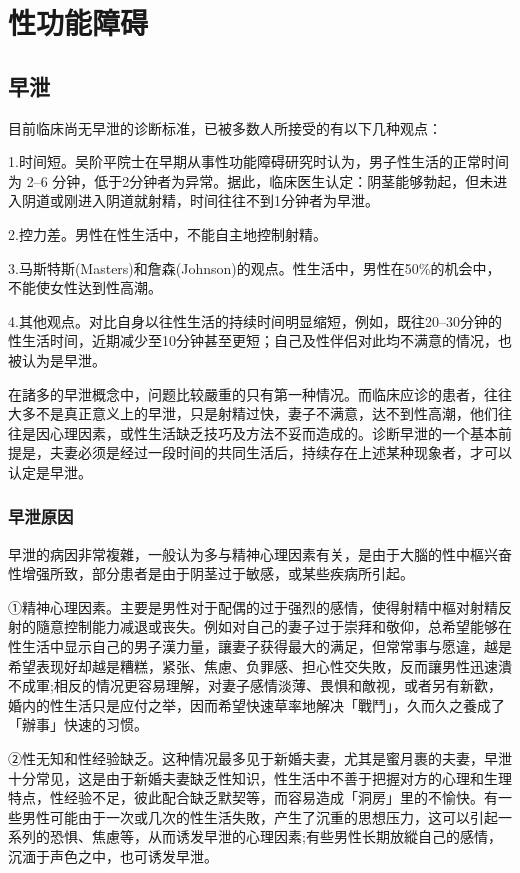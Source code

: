 \documentclass[12pt,UTF8]{ctexbook}
\begin{document}
\part{性功能障碍}

\chapter{早泄}

目前临床尚无早泄的诊断标准，已被多数人所接受的有以下几种观点：

1.时间短。吴阶平院士在早期从事性功能障碍研究时认为，男子性生活的正常时间为 2--6 分钟，低于2分钟者为异常。据此，临床医生认定：阴茎能够勃起，但未进入阴道或刚进入阴道就射精，时间往往不到1分钟者为早泄。

2.控力差。男性在性生活中，不能自主地控制射精。

3.马斯特斯(Masters)和詹森(Johnson)的观点。性生活中，男性在50\%的机会中，不能使女性达到性高潮。

4.其他观点。对比自身以往性生活的持续时间明显缩短，例如，既往20--30分钟的性生活时间，近期减少至10分钟甚至更短；自己及性伴侣对此均不满意的情况，也被认为是早泄。

在諸多的早泄概念中，问题比较嚴重的只有第一种情况。而临床应诊的患者，往往大多不是真正意义上的早泄，只是射精过快，妻子不满意，达不到性高潮，他们往往是因心理因素，或性生活缺乏技巧及方法不妥而造成的。诊断早泄的一个基本前提是，夫妻必须是经过一段时间的共同生活后，持续存在上述某种现象者，才可以认定是早泄。

\section{早泄原因}



早泄的病因非常複雜，一般认为多与精神心理因素有关，是由于大腦的性中樞兴奋性增强所致，部分患者是由于阴茎过于敏感，或某些疾病所引起。

①精神心理因素。主要是男性对于配偶的过于强烈的感情，使得射精中樞对射精反射的隨意控制能力减退或丧失。例如对自己的妻子过于崇拜和敬仰，总希望能够在性生活中显示自己的男子漢力量，讓妻子获得最大的满足，但常常事与愿違，越是希望表现好却越是糟糕，紧张、焦慮、负罪感、担心性交失敗，反而讓男性迅速潰不成軍;相反的情况更容易理解，对妻子感情淡薄、畏惧和敵视，或者另有新歡，婚内的性生活只是应付之举，因而希望快速草率地解决「戰鬥」，久而久之養成了「辦事」快速的习惯。

②性无知和性经验缺乏。这种情况最多见于新婚夫妻，尤其是蜜月裹的夫妻，早泄十分常见，这是由于新婚夫妻缺乏性知识，性生活中不善于把握对方的心理和生理特点，性经验不足，彼此配合缺乏默契等，而容易造成「洞房」里的不愉快。有一些男性可能由于一次或几次的性生活失敗，产生了沉重的思想压力，这可以引起一系列的恐惧、焦慮等，从而诱发早泄的心理因素;有些男性长期放縱自己的感情，沉湎于声色之中，也可诱发早泄。
\end{document}
